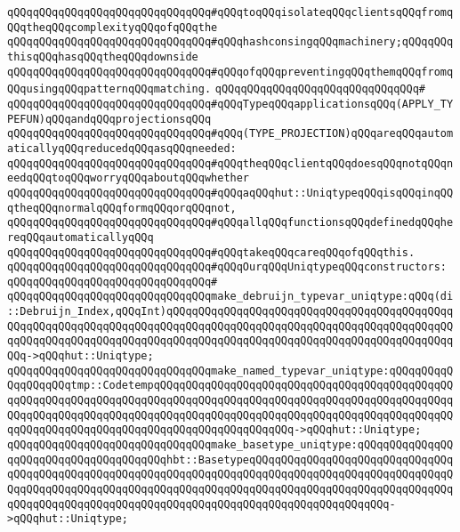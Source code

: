 \verb|qQQqqQQqqQQqqQQqqQQqqQQqqQQqqQQq#qQQqtoqQQqisolateqQQqclientsqQQqfromqQQqtheqQQqcomplexityqQQqofqQQqthe|\newline
\verb|qQQqqQQqqQQqqQQqqQQqqQQqqQQqqQQq#qQQqhashconsingqQQqmachinery;qQQqqQQqthisqQQqhasqQQqtheqQQqdownside|\newline
\verb|qQQqqQQqqQQqqQQqqQQqqQQqqQQqqQQq#qQQqofqQQqpreventingqQQqthemqQQqfromqQQqusingqQQqpatternqQQqmatching.|\newline
\verb|qQQqqQQqqQQqqQQqqQQqqQQqqQQqqQQq#|\newline
\verb|qQQqqQQqqQQqqQQqqQQqqQQqqQQqqQQq#qQQqTypeqQQqapplicationsqQQq(APPLY_TYPEFUN)qQQqandqQQqprojectionsqQQq|\newline
\verb|qQQqqQQqqQQqqQQqqQQqqQQqqQQqqQQq#qQQq(TYPE_PROJECTION)qQQqareqQQqautomaticallyqQQqreducedqQQqasqQQqneeded:|\newline
\verb|qQQqqQQqqQQqqQQqqQQqqQQqqQQqqQQq#qQQqtheqQQqclientqQQqdoesqQQqnotqQQqneedqQQqtoqQQqworryqQQqaboutqQQqwhether|\newline
\verb|qQQqqQQqqQQqqQQqqQQqqQQqqQQqqQQq#qQQqaqQQqhut::UniqtypeqQQqisqQQqinqQQqtheqQQqnormalqQQqformqQQqorqQQqnot,|\newline
\verb|qQQqqQQqqQQqqQQqqQQqqQQqqQQqqQQq#qQQqallqQQqfunctionsqQQqdefinedqQQqhereqQQqautomaticallyqQQq|\newline
\verb|qQQqqQQqqQQqqQQqqQQqqQQqqQQqqQQq#qQQqtakeqQQqcareqQQqofqQQqthis.|\newline
\newline
\newline
\verb|qQQqqQQqqQQqqQQqqQQqqQQqqQQqqQQq#qQQqOurqQQqUniqtypeqQQqconstructors:|\newline
\verb|qQQqqQQqqQQqqQQqqQQqqQQqqQQqqQQq#|\newline
\verb|qQQqqQQqqQQqqQQqqQQqqQQqqQQqqQQqmake_debruijn_typevar_uniqtype:qQQq(di::Debruijn_Index,qQQqInt)qQQqqQQqqQQqqQQqqQQqqQQqqQQqqQQqqQQqqQQqqQQqqQQqqQQqqQQqqQQqqQQqqQQqqQQqqQQqqQQqqQQqqQQqqQQqqQQqqQQqqQQqqQQqqQQqqQQqqQQqqQQqqQQqqQQqqQQqqQQqqQQqqQQqqQQqqQQqqQQqqQQqqQQqqQQqqQQqqQQqqQQqqQQq->qQQqhut::Uniqtype;|\newline
\verb|qQQqqQQqqQQqqQQqqQQqqQQqqQQqqQQqmake_named_typevar_uniqtype:qQQqqQQqqQQqqQQqqQQqtmp::CodetempqQQqqQQqqQQqqQQqqQQqqQQqqQQqqQQqqQQqqQQqqQQqqQQqqQQqqQQqqQQqqQQqqQQqqQQqqQQqqQQqqQQqqQQqqQQqqQQqqQQqqQQqqQQqqQQqqQQqqQQqqQQqqQQqqQQqqQQqqQQqqQQqqQQqqQQqqQQqqQQqqQQqqQQqqQQqqQQqqQQqqQQqqQQqqQQqqQQqqQQqqQQqqQQqqQQqqQQqqQQqqQQqqQQqqQQq->qQQqhut::Uniqtype;|\newline
\verb|qQQqqQQqqQQqqQQqqQQqqQQqqQQqqQQqmake_basetype_uniqtype:qQQqqQQqqQQqqQQqqQQqqQQqqQQqqQQqqQQqqQQqhbt::BasetypeqQQqqQQqqQQqqQQqqQQqqQQqqQQqqQQqqQQqqQQqqQQqqQQqqQQqqQQqqQQqqQQqqQQqqQQqqQQqqQQqqQQqqQQqqQQqqQQqqQQqqQQqqQQqqQQqqQQqqQQqqQQqqQQqqQQqqQQqqQQqqQQqqQQqqQQqqQQqqQQqqQQqqQQqqQQqqQQqqQQqqQQqqQQqqQQqqQQqqQQqqQQqqQQqqQQqqQQqqQQqqQQqqQQqqQQq->qQQqhut::Uniqtype;|\newline
